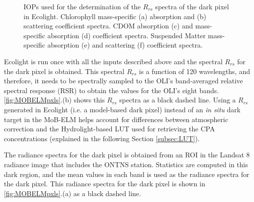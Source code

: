 \documentclass[onecolumn,3p,letterpaper]{elsarticle}
\begin{document}
\begin{figure}[htb!]
    \caption{IOPs used for the determination of the $R_{rs}$ spectra of the dark pixel in Ecolight. Chlorophyll mass-specific (a) absorption and (b) scattering coefficient spectra. CDOM absorption (c) and mass-specific absorption (d) coefficient spectra. Suspended Matter mass-specific absorption (e) and scattering (f) coefficient spectra.  \label{fig:IOPs} } 
\end{figure}

Ecolight is run once with all the inputs described above and the spectral $R_{rs}$ for the dark pixel is obtained. This spectral $R_{rs}$ is a function of 120 wavelengths, and therefore, it needs to be spectrally sampled to the OLI's band-averaged relative spectral response (RSR) to obtain the values for the OLI's eight bands. \autoref{fig:MOBELMpxls}.(b) shows this $R_{rs}$ spectra as a black dashed line. Using a $R_{rs}$ generated in Ecolight (i.e. a model-based dark pixel) instead of an {\it in situ} dark target in the MoB-ELM helps account for differences between atmospheric correction and the Hydrolight-based LUT used for retrieving the CPA concentrations (explained in the following Section \ref{subsec:LUT}).

The radiance spectra for the dark pixel is obtained from an ROI in the Landsat 8 radiance image that includes the ONTNS station. Statistics are computed in this dark region, and the mean values in each band is used as the radiance spectra for the dark pixel. This radiance spectra for the dark pixel is shown in \autoref{fig:MOBELMpxls}.(a) as a black dashed line.
\end{document}
